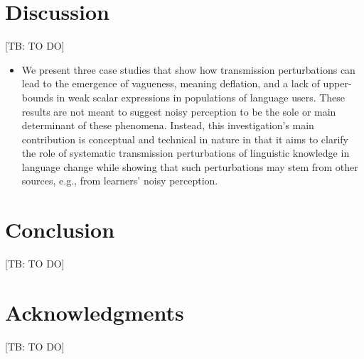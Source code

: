\documentclass[10pt,a4paper]{article}
\newcommand{\tb}[1]{\textcolor[rgb]{.8,.33,.0}{[TB: #1]}}%
\begin{document}
\section{Discussion}
\tb{TO DO} 

\begin{itemize}
\item We present three case studies that show how transmission perturbations can lead to the
  emergence of vagueness, meaning deflation, and a lack of upper-bounds in weak scalar
  expressions in populations of language users. These results are not meant to suggest noisy
  perception to be the sole or main determinant of these phenomena. Instead, this
  investigation's main contribution is conceptual and technical in nature in that it aims to
  clarify the role of systematic transmission perturbations of linguistic knowledge in language
  change while showing that such perturbations may stem from other sources, e.g., from
  learners' noisy perception.
\end{itemize}

\section{Conclusion}
\tb{TO DO}

\section{Acknowledgments}
\tb{TO DO}




\setlength{\bibleftmargin}{.125in}
\setlength{\bibindent}{-\bibleftmargin}


\end{document}
